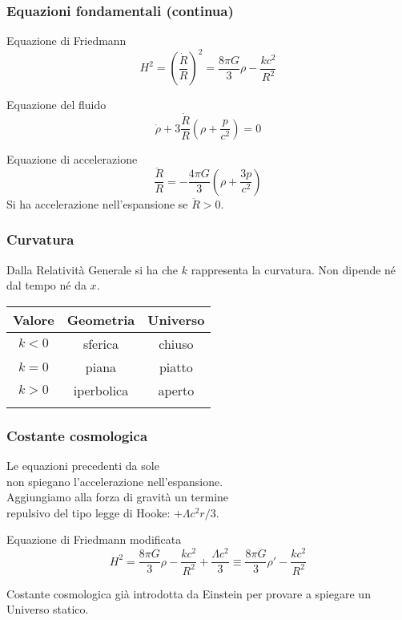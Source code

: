 \begin{frame}
  \frametitle{Equazioni fondamentali (continua)}
  \begin{block}{Equazione di Friedmann}
    \begin{equation*}
      H^2 = \left( \frac{\dot{R}}{R} \right)^2 = \frac{8\pi G}{3}\rho -
      \frac{kc^2}{R^2}
    \end{equation*}
  \end{block}
  \pause{}
  \begin{block}{Equazione del fluido}
    \begin{equation*}
      \dot{\rho} + 3\frac{\dot{R}}{R}\left( \rho + \frac{p}{c^2} \right) = 0
    \end{equation*}
  \end{block}
  \pause{}
  \begin{block}{Equazione di accelerazione}
    \begin{equation*}
    \frac{\ddot{R}}{R} = -\frac{4\pi G}{3}\left( \rho + \frac{3p}{c^2} \right)
  \end{equation*}
  Si ha accelerazione nell'espansione se $\ddot{R}>0$.
\end{block}
\end{frame}

\begin{frame}
  \frametitle{Curvatura}
  Dalla Relatività Generale si ha che $k$ rappresenta la curvatura. Non dipende
  né dal tempo né da $x$.
  \begin{table}
    \centering
    \begin{tabular}{ccc}
      \toprule{}
      Valore  & Geometria  & Universo \\
      \midrule{}
      $k < 0$ & sferica    & chiuso   \\
      $k = 0$ & piana      & piatto   \\
      $k > 0$ & iperbolica & aperto   \\
      \bottomrule{}
    \end{tabular}
  \end{table}
\end{frame}

\begin{frame}
  \frametitle{Costante cosmologica}
  Le equazioni precedenti da sole \\
  non spiegano l'accelerazione nell'espansione. \\
  Aggiungiamo alla forza di gravità un termine \\
  repulsivo del tipo legge di Hooke: $+\Lambda c^2r/3$.
  \begin{block}{Equazione di Friedmann modificata}
    \begin{equation*}
      H^2 = \frac{8\pi G}{3}\rho - \frac{kc^2}{R^2} + \frac{\Lambda c^2}{3}
      \equiv \frac{8\pi G}{3}\rho' - \frac{kc^2}{R^2}
    \end{equation*}
  \end{block}
  Costante cosmologica già introdotta da Einstein per provare a spiegare un
  Universo statico.
\end{frame}

